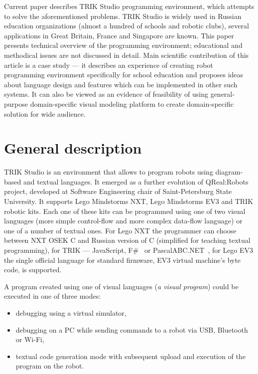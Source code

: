\documentclass[conference]{IEEEtran}
\begin{document}
Current paper describes TRIK Studio programming environment, which attempts to solve the aforementioned problems. TRIK Studio is widely used in Russian education organizations (almost a hundred of schools and robotic clubs), several applications in Great Britain, France and Singapore are known. This paper presents technical overview of the programming environment; educational and methodical issues are not discussed in detail. Main scientific contribution of this article is a case study --- it describes an experience of creating robot programming environment specifically for school education and proposes ideas about language design and features which can be implemented in other such systems. It can also be viewed as an evidence of feasibility of using general-purpose domain-specific visual modeling platform to create domain-specific solution for wide audience.

\section{General description}
\label{chapter:generalDescription}

TRIK Studio is an environment that allows to program robots using diagram-based and textual languages. It emerged as a further evolution of QReal:Robots~\cite{terekhov2013robots} project, developed at Software Engineering chair of Saint-Petersburg State University. It supports Lego Mindstorms NXT, Lego Mindstorms EV3 and TRIK robotic kits. Each one of these kits can be programmed using one of two visual languages (more simple control-flow and more complex data-flow language) or one of a number of textual ones. For Lego NXT the programmer can choose between NXT OSEK C and Russian version of C (simplified for teaching textual programming), for TRIK --- JavaScript, F\#~\cite{kirsanov2014robotics} or PascalABC.NET~\cite{doliner2014basics}, for Lego EV3 the single official language for standard firmware, EV3 virtual machine's byte code, is supported.

A program created using one of visual languages (\textit{a visual program}) could be executed in one of three modes:
\begin{itemize}
    \item debugging using a virtual simulator,
    \item debugging on a PC while sending commands to a robot via USB, Bluetooth or Wi-Fi,
    \item textual code generation mode with subsequent upload and execution of the program on the robot.
\end{itemize}
\end{document}
